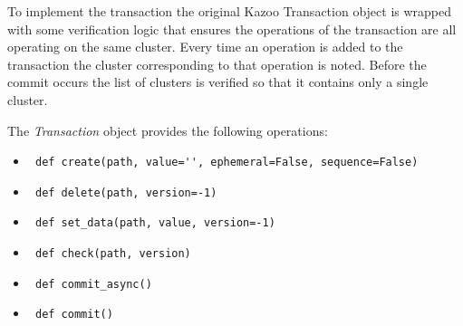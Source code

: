     To implement the transaction the original Kazoo Transaction object is wrapped with some verification logic that ensures the operations of the transaction are all operating on the same cluster. Every time an operation is added to the transaction the cluster corresponding to that operation is noted. Before the commit occurs the list of clusters is verified so that it contains only a single cluster.
    
    The \textit{Transaction} object provides the following operations:
    \begin{itemize}
	  \item \lstinline | def create(path, value='', ephemeral=False, sequence=False) |
	  \item \lstinline | def delete(path, version=-1) |
	  \item \lstinline | def set_data(path, value, version=-1) |
	  \item \lstinline | def check(path, version) |
	  \item \lstinline | def commit_async() |
	  \item \lstinline | def commit() |
	\end{itemize}